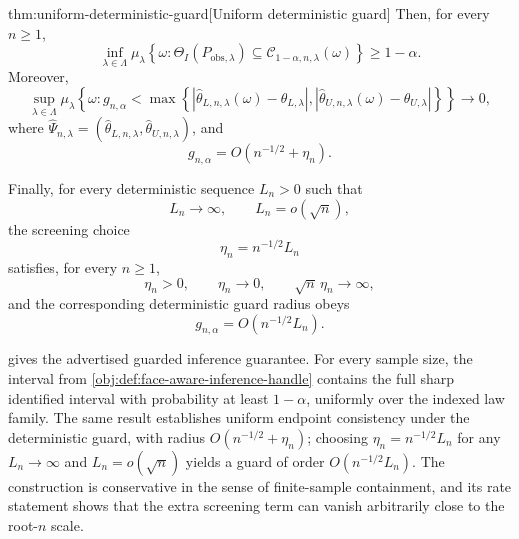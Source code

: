 \begin{theoremv}{thm:uniform-deterministic-guard}[Uniform deterministic guard]
Then, for every \(n\ge 1\),
\[
\inf_{\lambda\in\Lambda}
\mu_\lambda\!\left\{
\omega:
\Theta_I(P_{\mathrm{obs},\lambda})
\subseteq
\mathcal C_{1-\alpha,n,\lambda}(\omega)
\right\}
\ge
1-\alpha .
\]
Moreover,
\[
\sup_{\lambda\in\Lambda}
\mu_\lambda\!\left\{
\omega:
g_{n,\alpha}
<
\max\left\{
\left|\widehat\theta_{L,n,\lambda}(\omega)-\theta_{L,\lambda}\right|,
\left|\widehat\theta_{U,n,\lambda}(\omega)-\theta_{U,\lambda}\right|
\right\}
\right\}
\longrightarrow 0,
\]
where \(\widehat\Psi_{n,\lambda}=(\widehat\theta_{L,n,\lambda},\widehat\theta_{U,n,\lambda})\), and
\[
g_{n,\alpha}
=
O\!\left(n^{-1/2}+\eta_n\right).
\]

Finally, for every deterministic sequence \(L_n>0\) such that
\[
L_n\to\infty,
\qquad
L_n=o(\sqrt n),
\]
the screening choice
\[
\eta_n=n^{-1/2}L_n
\]
satisfies, for every \(n\ge 1\),
\[
\eta_n>0,
\qquad
\eta_n\to0,
\qquad
\sqrt n\,\eta_n\to\infty,
\]
and the corresponding deterministic guard radius obeys
\[
g_{n,\alpha}
=
O\!\left(n^{-1/2}L_n\right).
\]
\end{theoremv}

 gives the advertised guarded inference guarantee.  For every sample size, the interval from \cref{obj:def:face-aware-inference-handle} contains the full sharp identified interval with probability at least \(1-\alpha\), uniformly over the indexed law family.  The same result establishes uniform endpoint consistency under the deterministic guard, with radius \(O(n^{-1/2}+\eta_n)\); choosing \(\eta_n=n^{-1/2}L_n\) for any \(L_n\to\infty\) and \(L_n=o(\sqrt n)\) yields a guard of order \(O(n^{-1/2}L_n)\).  The construction is conservative in the sense of finite-sample containment, and its rate statement shows that the extra screening term can vanish arbitrarily close to the root-\(n\) scale.
